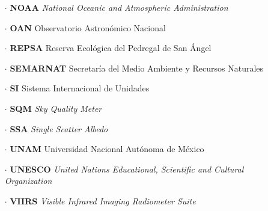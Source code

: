 \begin{itemize}
\item[$\cdot$] \textbf{NOAA} \textit{National Oceanic and Atmospheric Administration}

\item[$\cdot$] \textbf{OAN} Observatorio Astronómico Nacional

\item[$\cdot$] \textbf{REPSA} Reserva Ecológica del Pedregal de San Ángel

\item[$\cdot$] \textbf{SEMARNAT} Secretaría del Medio Ambiente y Recursos Naturales

\item[$\cdot$] \textbf{SI} Sistema Internacional de Unidades

\item[$\cdot$] \textbf{SQM} \textit{Sky Quality Meter}

\item[$\cdot$] \textbf{SSA} \textit{Single Scatter Albedo}

\item[$\cdot$] \textbf{UNAM} Universidad Nacional Autónoma de México

\item[$\cdot$] \textbf{UNESCO} \textit{United Nations Educational, Scientific and Cultural Organization}

\item[$\cdot$] \textbf{VIIRS} \textit{Visible Infrared Imaging Radiometer Suite}
			
\end{itemize}
